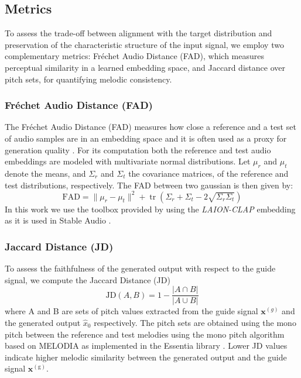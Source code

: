 \documentclass[twoside,a4paper]{article}
\begin{document}
 \subsection{Metrics}
 \label{Metrics}
To assess the trade-off between alignment with the target distribution and preservation of the characteristic structure of the input signal, we employ two complementary metrics: Fréchet Audio Distance (FAD), which measures perceptual similarity in a learned embedding space, and Jaccard distance over pitch sets, for quantifying melodic consistency.

\subsubsection{Fréchet Audio Distance (FAD)}
 The Fréchet Audio Distance (FAD) measures how close a reference and a test set of audio samples are  in an embedding space and it is often used as a proxy for generation quality \cite{kilgour2019frechetaudiodistancemetric}.
For its computation both the reference and test audio embeddings are modeled with multivariate normal distributions. Let $\mu_r$ and $\mu_t$ denote the means, and $\Sigma_r$ and $\Sigma_t$ the covariance matrices, of the reference and test distributions, respectively. The FAD between two gaussian is then given by:    \begin{equation}
        \mathrm{FAD} = \lVert \mu_r - \mu_t \rVert^2 
        + \operatorname{tr}\left( 
        \Sigma_r + \Sigma_t - 2\sqrt{\Sigma_r \Sigma_t} 
        \right)
    \end{equation}
In this work we use the toolbox provided by \cite{guiAdaptingFrechetAudio2024} using the \textit{LAION-CLAP} embedding as it is used in Stable Audio \cite{evans2024stableaudioopen}.


\subsubsection{Jaccard Distance (JD)}

To assess the faithfulness of the generated output with respect to the guide signal, we compute the Jaccard Distance (JD)
    \begin{equation}
        \mathrm{JD}(A, B) = 1 - \frac{|A \cap B|}{|A \cup B|}
    \end{equation}
where A and B are sets of pitch values extracted from the guide signal $\mathbf{x}^{(g)}$
and the generated output $\hat{x}_0$
respectively. The pitch sets are obtained using the mono pitch
between the reference and test melodies using the mono pitch algorithm based on MELODIA \cite{6155601} as implemented in the Essentia library \cite{10.1145/2502081.2502229}. Lower JD values indicate higher melodic similarity between the generated output and the guide signal $\mathbf{x}^{(\mathrm g)}$.
\end{document}
